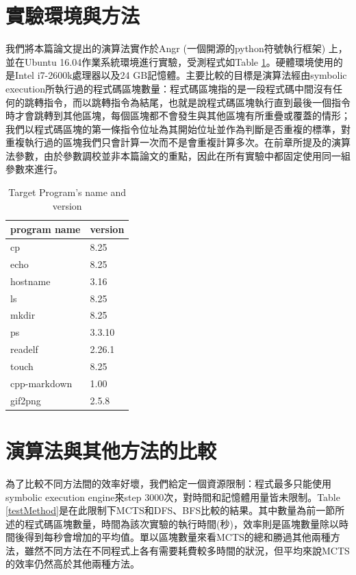 \documentclass[12pt,a4paper,oneside]{book}
\begin{document}
\section{實驗環境與方法}

我們將本篇論文提出的演算法實作於Angr (一個開源的python符號執行框架) \cite{angr}上，並在Ubuntu 16.04作業系統環境進行實驗，受測程式如Table \ref{binarys}。硬體環境使用的是Intel i7-2600k處理器以及24 GB記憶體。主要比較的目標是演算法經由symbolic execution所執行過的程式碼區塊數量：程式碼區塊指的是一段程式碼中間沒有任何的跳轉指令，而以跳轉指令為結尾，也就是說程式碼區塊執行直到最後一個指令時才會跳轉到其他區塊，每個區塊都不會發生與其他區塊有所重疊或覆蓋的情形；我們以程式碼區塊的第一條指令位址為其開始位址並作為判斷是否重複的標準，對重複執行過的區塊我們只會計算一次而不是會重複計算多次。在前章所提及的演算法參數，由於參數調校並非本篇論文的重點，因此在所有實驗中都固定使用同一組參數來進行。

\newcommand{\ra}[1]{\renewcommand{\arraystretch}{#1}}
\begin{table}[htbp]\centering
\caption{Target Program's name and version}
\label{binarys}
\begin{tabular}{@{}ll@{}}\toprule
program name & version \\ \midrule
cp           & 8.25    \\ 
echo         & 8.25    \\ 
hostname     & 3.16    \\ 
ls           & 8.25    \\ 
mkdir        & 8.25    \\ 
ps           & 3.3.10  \\ 
readelf      & 2.26.1  \\ 
touch        & 8.25    \\ 
cpp-markdown & 1.00    \\ 
gif2png      & 2.5.8   \\ \bottomrule
\end{tabular}
\end{table}

\section{演算法與其他方法的比較}

為了比較不同方法間的效率好壞，我們給定一個資源限制：程式最多只能使用symbolic execution engine來step 3000次，對時間和記憶體用量皆未限制。Table \ref{testMethod}是在此限制下MCTS和DFS、BFS比較的結果。其中數量為前一節所述的程式碼區塊數量，時間為該次實驗的執行時間(秒)，效率則是區塊數量除以時間後得到每秒會增加的平均值。單以區塊數量來看MCTS的總和勝過其他兩種方法，雖然不同方法在不同程式上各有需要耗費較多時間的狀況，但平均來說MCTS的效率仍然高於其他兩種方法。
\end{document}
